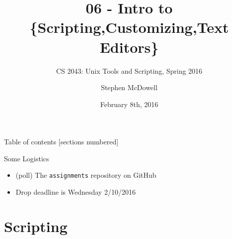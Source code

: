 %
%
%
%


%
%
\title{06 \-- Intro to \{Scripting,Customizing,Text Editors\}}
\subtitle{CS 2043: Unix Tools and Scripting, Spring 2016 \cite{prevSemesters}}
\date{February 8th, 2016}
\author{Stephen McDowell}


\maketitle

\begin{frame}{Table of contents}
  [sections numbered]
  \tableofcontents[hideallsubsections]
\end{frame}

\begin{frame}{Some Logistics}
  \begin{itemize}[<+- | alert@+>]
    \item (poll) The \texttt{assignments} repository on GitHub
    \item Drop deadline is Wednesday 2/10/2016
  \end{itemize}
\end{frame}

%
\section{Scripting}
\label{sec:scripting}

